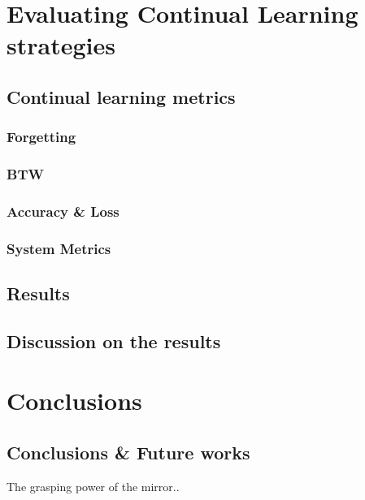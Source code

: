 \documentclass[english, LaM, oneside]{sapthesis}%
\begin{document}
\part{Evaluating Continual Learning strategies}

\chapter{Continual learning metrics}
\section{Forgetting}
\section{BTW}
\section{Accuracy & Loss}
\section{System Metrics}

\chapter{Results }

\chapter{Discussion on the results}


\part{Conclusions}
\chapter{Conclusions \& Future works}
The grasping power of the mirror..
\end{document}
